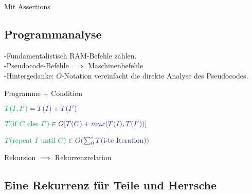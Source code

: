 \documentclass[a4paper]{scrartcl}
\begin{document}
 			\begin{algorithm}
 				\caption{Mit Assertions}
 				\DontPrintSemicolon
 				
 			\end{algorithm}	
 		
 			
 		\subsection{Programmanalyse}
 			-Fundamentalistisch RAM-Befehle zählen. \\
 			-Pseudocode-Befehle \( \implies \) Maschinenbefehle\\
 			-Hintergedanke: \( O \)-Notation vereinfacht die direkte Analyse des Pseudocodes.
 				\begin{labeling}{Programme + Condition}
 					\item[Zweier Programme]
 						\( \textcolor{Green}{ T ( I, I' ) } = \textcolor{Blue}{ T( I ) + T ( I' ) } \) \reversemarginpar	{}
 					\item[Programme + Condition]
 						\(  \textcolor{Green}{  T (  \text{if }  C  \text{ else } I') } \in \textcolor{Blue}{ O [ T ( C ) + max( T( I ), T ( I' ) ) ] } \)
 					\item[do-for Schleife]
 						\( \textcolor{Green}{ T(  \text{repeat } I \text{ until } C) } \in \textcolor{Blue}{ O ( \sum_0^i T (\text{i-te Iteration} ) ) } \)
 				\end{labeling}
 			Rekursion \( \implies \) Rekurrenzrelation
 		\subsection{Eine Rekurrenz für Teile und Herrsche}
\end{document}
